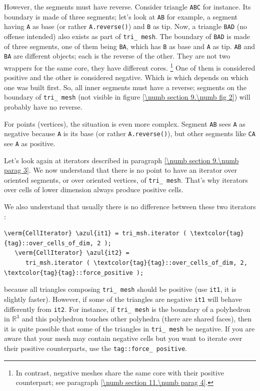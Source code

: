 However, the segments must have reverse.
Consider triangle {\small\tt ABC} for instance.
Its boundary is made of three segments; let's look at {\small\tt AB} for example,
a segment having {\small\tt A} as base (or rather {\small\tt A.reverse()}) and
{\small\tt B} as tip.
Now, a triangle {\small\tt BAD} (no offense intended) also exists as part of
{\small\tt tri\_\,mesh}.
The boundary of {\small\tt BAD} is made of three segments, one of them being {\small\tt BA},
which has {\small\tt B} as base and {\small\tt A} as tip.
{\small\tt AB} and {\small\tt BA} are different {\small\tt {}} objects;
each is the reverse of the other.
They are not two wrappers for the same core, they have different cores.%
\footnote {In contrast, negative meshes share the same core with their positive
counterpart; see paragraph \ref{\numb section 11.\numb parag 4}.}
One of them is considered positive and the other is considered negative.
Which is which depends on which one was built first.
So, all inner segments must have a reverse;
segments on the boundary of {\small\tt tri\_\,mesh} (not visible in figure
\ref{\numb section 9.\numb fig 2}) will probably have no reverse.

For points (vertices), the situation is even more complex.
Segment {\small\tt AB} sees {\small\tt A} as negative because {\small\tt A} is its base
(or rather {\small\tt A.reverse()}),
but other segments like {\small\tt CA} see {\small\tt A} as positive.

Let's look again at iterators described in paragraph \ref{\numb section 9.\numb parag 3}.
We now understand that there is no point to have an iterator over oriented
segments, or over oriented vertices, of {\small\tt tri\_\,mesh}.
That's why iterators over cells of lower dimension always produce positive cells.

We also understand that usually there is no difference between these two iterators :

\begin{Verbatim}[commandchars=\\\{\},formatcom=\small\tt,
   baselinestretch=0.94,framesep=2mm                      ]
   \verm{CellIterator} \azul{it1} = tri_msh.iterator ( \textcolor{tag}{tag}::over_cells_of_dim, 2 );
   \verm{CellIterator} \azul{it2} =
      tri_msh.iterator ( \textcolor{tag}{tag}::over_cells_of_dim, 2, \textcolor{tag}{tag}::force_positive );
\end{Verbatim}

\noindent because all triangles composing {\small\tt tri\_\,mesh} should be positive
(use {\small\tt it1}, it is slightly faster).
However, if some of the triangles are negative {\small\tt it1} will behave differently from
{\small\tt it2}.
For instance, if {\small\tt tri\_\,mesh} is the boundary of a polyhedron in $ \mathbb{R}^3 $
and this polyhedron touches other polyhedra (there are shared faces), then it is
quite possible that some of the triangles in {\small\tt tri\_\,mesh} be negative.
If you are aware that your mesh may contain negative cells but
you want to iterate over their positive counterparts, use the {\small\tt \textcolor{tag}{tag}::force\_\,positive}.

